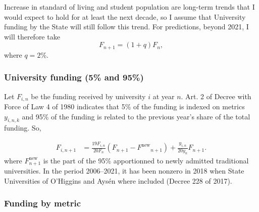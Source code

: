 \documentclass[twocolumn]{article}
\def\Fnew{\ensuremath{F^\text{new}}}
\begin{document}
Increase in standard of living and student population are long-term trends that I would expect to hold for at least the next decade, so I assume that University funding by the State will still follow this trend. For predictions, beyond 2021, I will therefore take
\begin{equation}
    F_{n+1} = (1+q) F_n, \label{eq:F}
\end{equation}
where $q = 2$\%.

\subsubsection{University funding (5\% and 95\%)}

Let $F_{i,n}$ be the funding received by university $i$ at year $n$. Art. 2 of
Decree with Force of Law 4 of 1980 indicates that 5\% of the funding is indexed
on metrics $y_{i,n,k}$ and 95\% of the funding is related to the previous year's
share of the total funding.  So,

\begin{align}
    F_{i,n+1} &= \frac{19F_{i,n}}{20F_{n}}\left(F_{n+1} - \Fnew_{n+1}\right)
               + \frac{y_{i,n}}{20y_n} F_{n+1}.
        \label{eq:afd}
\end{align}
where $F_{n+1}^\text{new}$ is the part of the 95\% apportionned to newly admitted traditional universities.  In the period 2006--2021, it has been nonzero in 2018 when State Universities of O'Higgins and Aysén where included (Decree 228 of 2017).  

\subsubsection{Funding by metric}  
\end{document}
